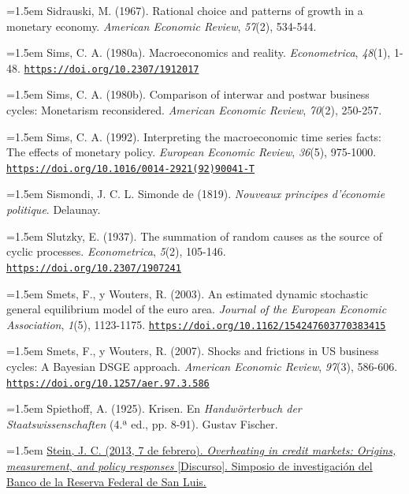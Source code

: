 \documentclass[10pt,a4paper]{article}
\begin{document}
\noindent\hangindent=1.5em Sidrauski, M. (1967). Rational choice and patterns of growth in a monetary economy. \textit{American Economic Review}, \textit{57}(2), 534-544.

\noindent\hangindent=1.5em Sims, C. A. (1980a). Macroeconomics and reality. \textit{Econometrica}, \textit{48}(1), 1-48. \href{https://doi.org/10.2307/1912017}{\nolinkurl{https://doi.org/10.2307/1912017}}

\noindent\hangindent=1.5em Sims, C. A. (1980b). Comparison of interwar and postwar business cycles: Monetarism reconsidered. \textit{American Economic Review}, \textit{70}(2), 250-257.

\noindent\hangindent=1.5em Sims, C. A. (1992). Interpreting the macroeconomic time series facts: The effects of monetary policy. \textit{European Economic Review}, \textit{36}(5), 975-1000. \href{https://doi.org/10.1016/0014-2921(92)90041-T}{\nolinkurl{https://doi.org/10.1016/0014-2921(92)90041-T}}

\noindent\hangindent=1.5em Sismondi, J. C. L. Simonde de (1819). \textit{Nouveaux principes d'économie politique}. Delaunay.

\noindent\hangindent=1.5em Slutzky, E. (1937). The summation of random causes as the source of cyclic processes. \textit{Econometrica}, \textit{5}(2), 105-146. \href{https://doi.org/10.2307/1907241}{\nolinkurl{https://doi.org/10.2307/1907241}}

\noindent\hangindent=1.5em Smets, F., y Wouters, R. (2003). An estimated dynamic stochastic general equilibrium model of the euro area. \textit{Journal of the European Economic Association}, \textit{1}(5), 1123-1175. \href{https://doi.org/10.1162/154247603770383415}{\nolinkurl{https://doi.org/10.1162/154247603770383415}}

\noindent\hangindent=1.5em Smets, F., y Wouters, R. (2007). Shocks and frictions in US business cycles: A Bayesian DSGE approach. \textit{American Economic Review}, \textit{97}(3), 586-606. \href{https://doi.org/10.1257/aer.97.3.586}{\nolinkurl{https://doi.org/10.1257/aer.97.3.586}}

\noindent\hangindent=1.5em Spiethoff, A. (1925). Krisen. En \textit{Handwörterbuch der Staatswissenschaften} (4.ª ed., pp. 8-91). Gustav Fischer.

{\sloppy\noindent\hangindent=1.5em \href{https://www.federalreserve.gov/newsevents/speech/stein20130207a.htm}{Stein, J. C. (2013, 7 de febrero). \textit{Overheating in credit markets: Origins, measurement, and policy responses} [Discurso]. Simposio de investigación del Banco de la Reserva Federal de San Luis.}\par}
\end{document}
